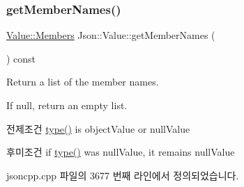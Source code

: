 \subsubsection{\texorpdfstring{get\+Member\+Names()}{getMemberNames()}}
{\footnotesize\ttfamily \hyperlink{class_json_1_1_value_a9ae9069983fc38f1928d76f9c79ac64d}{Value\+::\+Members} Json\+::\+Value\+::get\+Member\+Names (\begin{DoxyParamCaption}{ }\end{DoxyParamCaption}) const}



Return a list of the member names. 

If null, return an empty list. \begin{DoxyPrecond}{전제조건}
\hyperlink{class_json_1_1_value_a8ce61157a011894f0252ceed232312de}{type()} is object\+Value or null\+Value 
\end{DoxyPrecond}
\begin{DoxyPostcond}{후미조건}
if \hyperlink{class_json_1_1_value_a8ce61157a011894f0252ceed232312de}{type()} was null\+Value, it remains null\+Value 
\end{DoxyPostcond}


jsoncpp.\+cpp 파일의 3677 번째 라인에서 정의되었습니다.


